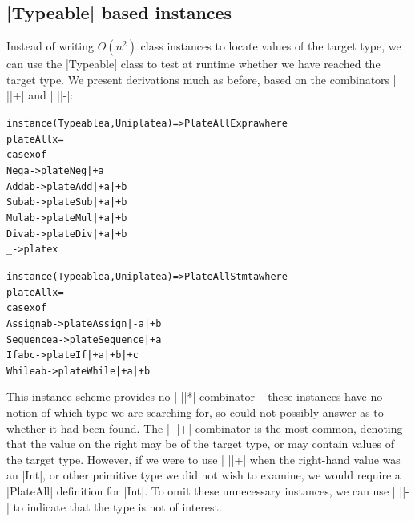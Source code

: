 \documentclass[preprint]{sigplanconf}
\newenvironment{code}{\begin{alltt}\small}{\end{alltt}}
\begin{document}
\subsection{|Typeable| based instances}
\label{sec:implement_playtypeable}

Instead of writing $O(n^2)$ class instances to locate values of the target type, we can use the |Typeable| class to test at runtime whether we have reached the target type. We present derivations much as before, based on the combinators | ||+| and | ||-|:

\begin{code}
instance (Typeable a, Uniplate a) => PlateAll Expr a where
    plateAll x =
        case x of
            Neg a    ->  plate Neg  |+ a
            Add a b  ->  plate Add  |+ a |+ b
            Sub a b  ->  plate Sub  |+ a |+ b
            Mul a b  ->  plate Mul  |+ a |+ b
            Div a b  ->  plate Div  |+ a |+ b
            _        ->  plate x

instance (Typeable a, Uniplate a) => PlateAll Stmt a where
    plateAll x =
        case x of
            Assign    a b    -> plate Assign    |-  a |+ b
            Sequence  a      -> plate Sequence  |+  a
            If        a b c  -> plate If        |+  a |+ b |+ c
            While     a b    -> plate While     |+  a |+ b
\end{code}

This instance scheme provides no | ||*| combinator -- these instances have no notion of which type we are searching for, so could not possibly answer as to whether it had been found. The | ||+| combinator is the most common, denoting that the value on the right may be of the target type, or may contain values of the target type. However, if we were to use | ||+| when the right-hand value was an |Int|, or other primitive type we did not wish to examine, we would require a |PlateAll| definition for |Int|. To omit these unnecessary instances, we can use | ||-| to indicate that the type is not of interest.
\end{document}
